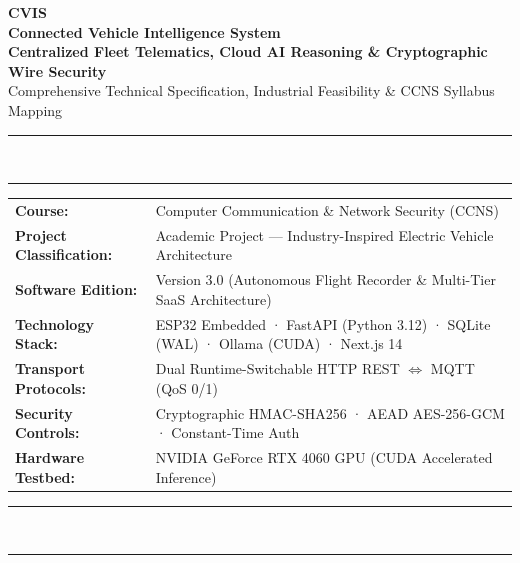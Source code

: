 \documentclass[12pt,a4paper]{report}
\begin{document}
\begin{titlepage}
\pagecolor{white}
\color{cvisdark}
\centering
\vspace*{0.6cm}

{\fontsize{42}{48}\selectfont\bfseries\color{cvisblue} CVIS}\\[6pt]
{\LARGE\bfseries\color{cvisdark} Connected Vehicle Intelligence System}\\[6pt]
{\large\bfseries\color{cvisteal} Centralized Fleet Telematics, Cloud AI Reasoning \& Cryptographic Wire Security}\\[4pt]
{\normalsize\color{cvisgray} Comprehensive Technical Specification, Industrial Feasibility \& CCNS Syllabus Mapping}

\vspace{0.5cm}
{\color{cvisblue}\rule{\textwidth}{1.5pt}}\\[-6pt]
{\color{cvisteal}\rule{\textwidth}{0.5pt}}
\vspace{0.4cm}

\begin{tabularx}{\textwidth}{L{4.2cm} X}
\textbf{Course:}           & Computer Communication \& Network Security (CCNS) \\[3pt]
\textbf{Project Classification:} & Academic Project — Industry-Inspired Electric Vehicle Architecture \\[3pt]
\textbf{Software Edition:} & Version 3.0 (Autonomous Flight Recorder \& Multi-Tier SaaS Architecture) \\[3pt]
\textbf{Technology Stack:} & ESP32 Embedded · FastAPI (Python 3.12) · SQLite (WAL) · Ollama (CUDA) · Next.js 14 \\[3pt]
\textbf{Transport Protocols:} & Dual Runtime-Switchable HTTP REST $\Longleftrightarrow$ MQTT (QoS 0/1) \\[3pt]
\textbf{Security Controls:} & Cryptographic HMAC-SHA256 · AEAD AES-256-GCM · Constant-Time Auth \\[3pt]
\textbf{Hardware Testbed:}  & NVIDIA GeForce RTX 4060 GPU (CUDA Accelerated Inference) \\[3pt]
\end{tabularx}

\vspace{0.4cm}
{\color{cvisteal}\rule{\textwidth}{0.5pt}}\\[-6pt]
{\color{cvisblue}\rule{\textwidth}{1.5pt}}
\vspace{0.5cm}


\end{titlepage}
\end{document}
